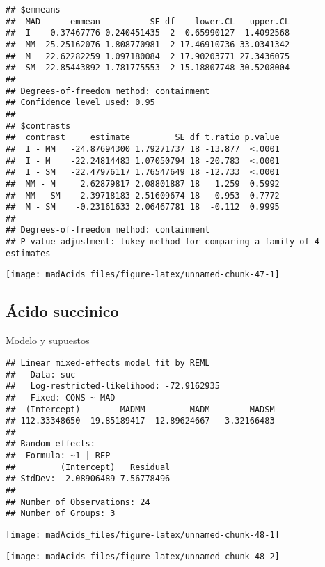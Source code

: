 \documentclass[
]{article}
\begin{document}
\begin{verbatim}
## $emmeans
##  MAD      emmean          SE df    lower.CL   upper.CL
##  I    0.37467776 0.240451435  2 -0.65990127  1.4092568
##  MM  25.25162076 1.808770981  2 17.46910736 33.0341342
##  M   22.62282259 1.097180084  2 17.90203771 27.3436075
##  SM  22.85443892 1.781775553  2 15.18807748 30.5208004
## 
## Degrees-of-freedom method: containment 
## Confidence level used: 0.95 
## 
## $contrasts
##  contrast     estimate         SE df t.ratio p.value
##  I - MM   -24.87694300 1.79271737 18 -13.877  <.0001
##  I - M    -22.24814483 1.07050794 18 -20.783  <.0001
##  I - SM   -22.47976117 1.76547649 18 -12.733  <.0001
##  MM - M     2.62879817 2.08801887 18   1.259  0.5992
##  MM - SM    2.39718183 2.51609674 18   0.953  0.7772
##  M - SM    -0.23161633 2.06467781 18  -0.112  0.9995
## 
## Degrees-of-freedom method: containment 
## P value adjustment: tukey method for comparing a family of 4 estimates
\end{verbatim}

\begin{center}\texttt{[image: madAcids\_files/figure-latex/unnamed-chunk-47-1]} \end{center}

\subsection{Ácido succinico}\label{uxe1cido-succinico-1}

Modelo y supuestos

\begin{verbatim}
## Linear mixed-effects model fit by REML
##   Data: suc 
##   Log-restricted-likelihood: -72.9162935
##   Fixed: CONS ~ MAD 
##  (Intercept)        MADMM         MADM        MADSM 
## 112.33348650 -19.85189417 -12.89624667   3.32166483 
## 
## Random effects:
##  Formula: ~1 | REP
##         (Intercept)   Residual
## StdDev:  2.08906489 7.56778496
## 
## Number of Observations: 24
## Number of Groups: 3
\end{verbatim}

\begin{center}\texttt{[image: madAcids\_files/figure-latex/unnamed-chunk-48-1]} \end{center}

\begin{center}\texttt{[image: madAcids\_files/figure-latex/unnamed-chunk-48-2]} \end{center}
\end{document}
